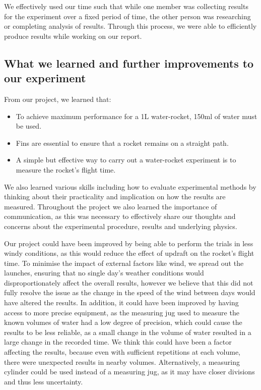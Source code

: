 \documentclass[14pt]{article}
\begin{document}
We effectively used our time such that while one member was collecting results for the experiment over a fixed period of time, the other person was researching or completing analysis of results. Through this process, we were able to efficiently produce results while working on our report.
\subsection{What we learned and further improvements to our experiment}
From our project, we learned that:
\begin{itemize}
\item To achieve maximum performance for a 1L water-rocket, 150ml of water must be used.
\item Fins are essential to ensure that a rocket remains on a straight path.
\item A simple but effective way to carry out a water-rocket experiment is to measure the rocket's flight time.
\end{itemize}
We also learned various skills including how to evaluate experimental methods by thinking about their practicality and implication on how the results are measured.
Throughout the project we also learned the importance of communication, as this was necessary to effectively share our thoughts and concerns about the experimental procedure, results and underlying physics.

Our project could have been improved by being able to perform the trials in less windy conditions, as this would reduce the effect of updraft on the rocket's flight time. To minimise the impact of external factors like wind, we spread out the launches, ensuring that no single day's weather conditions would disproportionately affect the overall results, however we believe that this did not fully resolve the issue as the change in the speed of the wind between days would have altered the results. In addition, it could have been improved by having access to more precise equipment, as the measuring jug used to measure the known volumes of water had a low degree of precision, which could cause the results to be less reliable, as a small change in the volume of water resulted in a large change in the recorded time. We think this could have been a factor affecting the results, because even with sufficient repetitions at each volume, there were unexpected results in nearby volumes. Alternatively, a measuring cylinder could be used instead of a measuring jug, as it may have closer divisions and thus less uncertainty.
\end{document}
